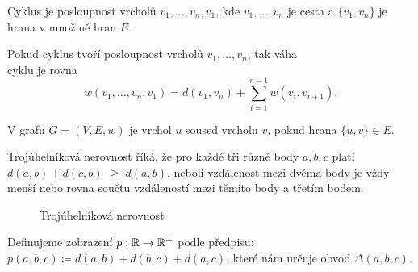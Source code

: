 \begin{definition}[Cyklus]
  \label{definice:cyklus}
  Cyklus je posloupnost vrcholů $v_1,\ldots,v_n,v_1$, kde $v_1,\ldots,v_n$ je cesta a  $\{v_1,v_n\}$ je hrana v množině hran $E$.
\end{definition}

\begin{definition}
  \label{definice:vaha_cyklu}
  Pokud cyklus tvoří posloupnost vrcholů $v_1, \ldots, v_n$, tak váha \\cyklu je rovna \[ w(v_1,\dots ,v_n, v_1) = d(v_1, v_n) + \sum_{i=1}^{n-1}w(v_i, v_{i+1}). \]
\end{definition}

\begin{definition}[Soused]
  \label{definice:soused}
  V grafu $G = (V, E, w)$ je vrchol $u$ soused vrcholu $v$, pokud hrana $\{u, v\} \in E$.
\end{definition}

\begin{definition}
  \label{definice:trojuhelnikova_nerovnost}
  Trojúhelníková nerovnost říká, že pro kaž\-dé tři různé body $a, b, c$ platí \textcolor{myblue}{$d(a, b)+d(c, b)$} $\geq$ \textcolor{myred}{$d(a,b)$}, neboli vzdálenost mezi dvěma body je vždy menší nebo rovna součtu vzdáleností mezi těmito body a třetím bodem.

  \begin{figure}[h]
    \centering
    \caption{Trojúhelníková nerovnost}
  \end{figure}
\end{definition}

\begin{definition}
  \label{definice:obvod_troj}
  Definujeme zobrazení $p: \mathbb{R}\rightarrow \mathbb{R}^+$ podle předpisu: $p(a, b, c) \coloneqq d(a, b) + d(b, c) + d(a, c)$, které nám určuje obvod $\Delta(a,b,c)$.
\end{definition}

